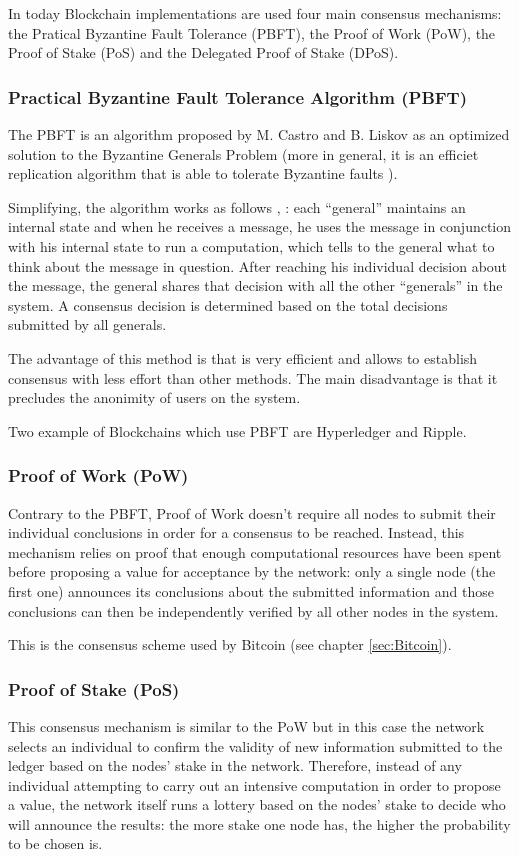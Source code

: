In today Blockchain implementations are used four main consensus mechanisms:
the Pratical Byzantine Fault Tolerance (PBFT), the Proof of Work (PoW),
the Proof of Stake (PoS) and the Delegated Proof of Stake (DPoS).

\subsubsection{Practical Byzantine Fault Tolerance Algorithm (PBFT)}
The PBFT is an algorithm proposed by M. Castro and B. Liskov as an optimized solution
to the Byzantine Generals Problem (more in general, it is an efficiet replication
algorithm that is able to tolerate Byzantine faults \cite{castro1999practical}).

Simplifying, the algorithm works as follows \cite{blockchain-consensus-medium},
\cite{castro1999practical}: each ``general'' maintains an
internal state and when he receives a message, he uses the message in
conjunction with his internal state to run a computation, which tells to the
general what to think about the message in question.
After reaching his individual decision about the message, the general shares that
decision with all the other ``generals'' in the system.
A consensus decision is determined based on the total decisions submitted by all
generals.


The advantage of this method is that is very efficient and allows to establish
consensus with less effort than other methods. The main disadvantage is that it
precludes the anonimity of users on the system.

Two example of Blockchains which use PBFT are Hyperledger and Ripple.

\subsubsection{Proof of Work (PoW)}
Contrary to the PBFT, Proof of Work doesn't require all nodes to submit their
individual conclusions in order for a consensus to be reached. Instead, this
mechanism relies on proof that enough computational resources have been spent
before proposing a value for acceptance by the network: only a single node (the first one)
announces its conclusions about the submitted information and those conclusions
can then be independently verified by all other nodes in the system.

This is the consensus scheme used by Bitcoin (see chapter \ref{sec:Bitcoin}).

\subsubsection{Proof of Stake (PoS)}
This consensus mechanism is similar to the PoW but in this case the network
selects an individual to confirm the validity of new information submitted to
the ledger based on the nodes' stake in the network. Therefore, instead of any
individual attempting to carry out an intensive computation in order to propose
a value, the network itself runs a lottery based on the nodes' stake to decide
who will announce the results: the more stake one node has, the higher the probability
to be chosen is.

